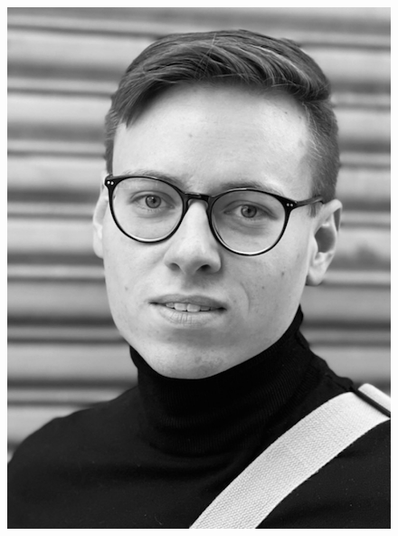\documentclass[10pt, a4paper,onecolumn ,titlepage]{article}
\begin{document}
\begin{titlepage}
\begin{center}
            \begin{figure}[H]
                \centering
                \begin{minipage}[b]{.13\linewidth} %
                    \includegraphics[width=\linewidth]{author_pictures/chris_2}
                \end{minipage}\label{fig:chris}
                \hspace{.005\linewidth}%
                \begin{minipage}[b]{.13\linewidth} %

\end{minipage}
\end{figure}
\end{center}
\end{titlepage}
\end{document}
